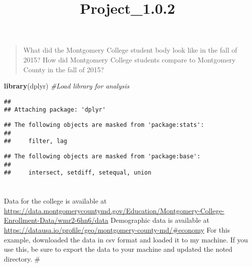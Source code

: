 \documentclass[]{article}
\title{Project\_1.0.2}
\author{}
\date{}
\newenvironment{Shaded}{\begin{snugshade}}{\end{snugshade}}
\newcommand{\KeywordTok}[1]{\textcolor[rgb]{0.13,0.29,0.53}{\textbf{#1}}}
\newcommand{\CommentTok}[1]{\textcolor[rgb]{0.56,0.35,0.01}{\textit{#1}}}
\newcommand{\NormalTok}[1]{#1}
\begin{document}
\maketitle

\begin{quote}
What did the Montgomery College student body look like in the fall of
2015? How did Montgomery College students compare to Montgomery County
in the fall of 2015?
\end{quote}

\begin{Shaded}
\begin{Highlighting}[]
\KeywordTok{library}\NormalTok{(dplyr) }\CommentTok{#Load library for analysis}
\end{Highlighting}
\end{Shaded}

\begin{verbatim}
## 
## Attaching package: 'dplyr'
\end{verbatim}

\begin{verbatim}
## The following objects are masked from 'package:stats':
## 
##     filter, lag
\end{verbatim}

\begin{verbatim}
## The following objects are masked from 'package:base':
## 
##     intersect, setdiff, setequal, union
\end{verbatim}

\section{}\label{section}

Data for the college is available at
\url{https://data.montgomerycountymd.gov/Education/Montgomery-College-Enrollment-Data/wmr2-6hn6/data}
Demographic data is available at
\url{https://datausa.io/profile/geo/montgomery-county-md/\#economy} For
this example, downloaded the data in csv format and loaded it to my
machine. If you use this, be sure to export the data to your machine and
updated the noted directory. \#
\end{document}

